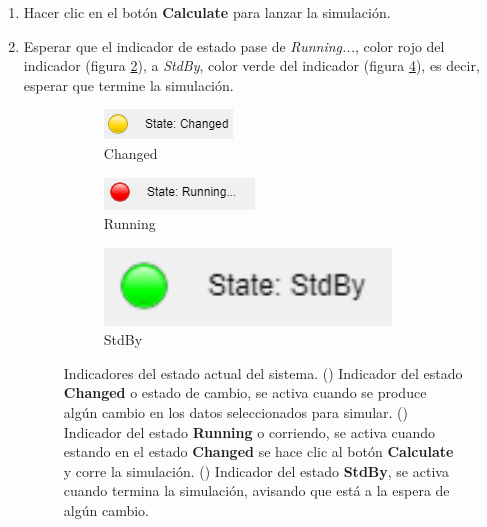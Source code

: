 \begin{enumerate}
	\item Hacer clic en el botón \textbf{Calculate} para lanzar la simulación.
	\item Esperar que el indicador de estado pase de \textit{Running...}, color rojo del indicador (figura \ref{fig:indicador_Running}), a \textit{StdBy}, color verde del indicador (figura \ref{fig:indicador_StdBy}), es decir, esperar que termine la simulación.
	\begin{figure}[H]
	\centering
	\begin{subfigure}[b]{0.3\textwidth}
	\centering
	\includegraphics[width=\textwidth]{figuras/Procedimiento_Simulaciones/Radiacion/estado_changed}%
	\caption{Changed}%
	\label{fig:indicador_Changed}%
	\end{subfigure}
	\hfill
	\begin{subfigure}[b]{0.3\textwidth}
	\centering
	\includegraphics[width=\textwidth]{figuras/Procedimiento_Simulaciones/Radiacion/estado_running}%
	\caption{Running}%
	\label{fig:indicador_Running}%
	\end{subfigure}
	\hfill
	\begin{subfigure}[b]{0.3\textwidth}
	\centering
	\includegraphics[width=0.9\textwidth]{figuras/Procedimiento_Simulaciones/Radiacion/estado_stdby}%
	\caption{StdBy}%
	\label{fig:indicador_StdBy}%
	\end{subfigure}
	\hfill
	\caption{Indicadores del estado actual del sistema. () Indicador del estado \textbf{Changed} o estado de cambio, se activa cuando se produce algún cambio en los datos seleccionados para simular. () Indicador del estado \textbf{Running} o corriendo, se activa cuando estando en el estado \textbf{Changed} se hace clic al botón \textbf{Calculate} y corre la simulación. () Indicador del estado \textbf{StdBy}, se activa cuando termina la simulación, avisando que está a la espera de algún cambio.}

\end{figure}
\end{enumerate}
